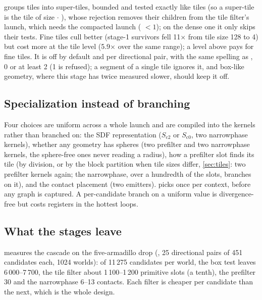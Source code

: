  groups tiles into super-tiles, bounded and tested exactly like tiles (so a super-tile is the tile of size  $\cdot$ ), whose rejection removes their children from the tile filter's launch, which needs the compacted launch ( $< 1$); on the dense one it only skips their tests. Fine tiles cull better (stage-1 survivors fell 11$\times$ from tile size 128 to 4) but cost more at the tile level (5.9$\times$ over the same range); a level above pays for fine tiles. It is off by default and per directional pair, with the same spelling as , 0 or at least 2 (1 is refused); a segment of a single tile ignores it, and box-like geometry, where this stage has twice measured slower, should keep it off.

\subsection{Specialization instead of branching}\label{sec:specialize}

Four choices are uniform across a whole launch and are compiled into the kernels rather than branched on: the SDF representation ($S_{\mathrm{c2}}$ or $S_{\mathrm{c0}}$, two narrowphase kernels), whether any geometry has spheres (two prefilter and two narrowphase kernels, the sphere-free ones never reading a radius), how a prefilter slot finds its tile (by division, or by the block partition when tile sizes differ, \cref{sec:tiles}: two prefilter kernels again; the narrowphase, over a hundredth of the slots, branches on it), and the contact placement (two emitters).  picks once per context, before any graph is captured. A per-candidate branch on a uniform value is divergence-free but costs registers in the hottest loops.

\subsection{What the stages leave}\label{sec:funnel}

 measures the cascade on the five-armadillo drop (, 25 directional pairs of 451 candidates each, 1024 worlds): of 11\,275 candidates per world, the box test leaves 6\,000--7\,700, the tile filter about 1\,100--1\,200 primitive slots (a tenth), the prefilter 30 and the narrowphase 6--13 contacts. Each filter is cheaper per candidate than the next, which is the whole design.

